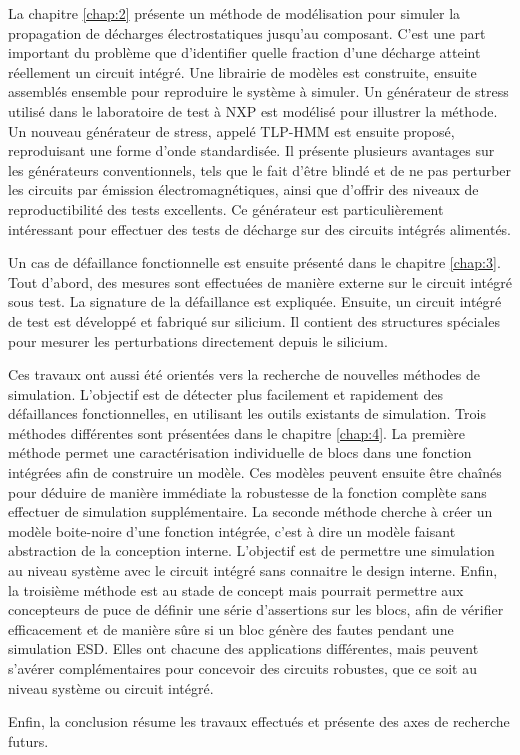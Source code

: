 %
La chapitre \ref{chap:2} présente un méthode de modélisation pour simuler la propagation de décharges électrostatiques jusqu'au composant.
C'est une part important du problème que d'identifier quelle fraction d'une décharge atteint réellement un circuit intégré.
Une librairie de modèles est construite, ensuite assemblés ensemble pour reproduire le système à simuler.
Un générateur de stress utilisé dans le laboratoire de test à NXP est modélisé pour illustrer la méthode.
Un nouveau générateur de stress, appelé TLP-HMM est ensuite proposé, reproduisant une forme d'onde standardisée.
Il présente plusieurs avantages sur les générateurs conventionnels, tels que le fait d'être blindé et de ne pas perturber les circuits par émission électromagnétiques, ainsi que d'offrir des niveaux de reproductibilité des tests excellents.
Ce générateur est particulièrement intéressant pour effectuer des tests de décharge sur des circuits intégrés alimentés.

%
Un cas de défaillance fonctionnelle est ensuite présenté dans le chapitre \ref{chap:3}.
Tout d'abord, des mesures sont effectuées de manière externe sur le circuit intégré sous test.
La signature de la défaillance est expliquée.
Ensuite, un circuit intégré de test est développé et fabriqué sur silicium.
Il contient des structures spéciales pour mesurer les perturbations directement depuis le silicium.

%
Ces travaux ont aussi été orientés vers la recherche de nouvelles méthodes de simulation.
L'objectif est de détecter plus facilement et rapidement des défaillances fonctionnelles, en utilisant les outils existants de simulation.
Trois méthodes différentes sont présentées dans le chapitre \ref{chap:4}.
La première méthode permet une caractérisation individuelle de blocs dans une fonction intégrées afin de construire un modèle.
Ces modèles peuvent ensuite être chaînés pour déduire de manière immédiate la robustesse de la fonction complète sans effectuer de simulation supplémentaire.
La seconde méthode cherche à créer un modèle boite-noire d'une fonction intégrée, c'est à dire un modèle faisant abstraction de la conception interne.
L'objectif est de permettre une simulation au niveau système avec le circuit intégré sans connaitre le design interne.
Enfin, la troisième méthode est au stade de concept mais pourrait permettre aux concepteurs de puce de définir une série d'assertions sur les blocs, afin de vérifier efficacement et de manière sûre si un bloc génère des fautes pendant une simulation ESD.
Elles ont chacune des applications différentes, mais peuvent s'avérer complémentaires pour concevoir des circuits robustes, que ce soit au niveau système ou circuit intégré.

%
Enfin, la conclusion résume les travaux effectués et présente des axes de recherche futurs.
